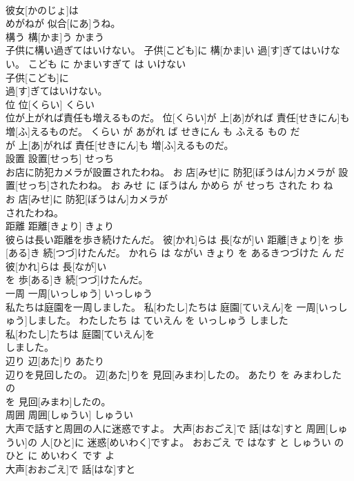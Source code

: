 \documentclass[8pt]{extreport}
\begin{document}
\begin{CJK}{UTF8}{min}
\\	彼女[かのじょ]は
\\	めがねが 似合[にあ]うね。			
\\	構う	構[かま]う	かまう	
\\	子供に構い過ぎてはいけない。	子供[こども]に 構[かま]い 過[す]ぎてはいけない。	こども に かまいすぎて は いけない	
\\	子供[こども]に
\\	過[す]ぎてはいけない。			
\\	位	位[くらい]	くらい	
\\	位が上がれば責任も増えるものだ。	位[くらい]が 上[あ]がれば 責任[せきにん]も 増[ふ]えるものだ。	くらい が あがれ ば せきにん も ふえる もの だ	
\\	が 上[あ]がれば 責任[せきにん]も 増[ふ]えるものだ。			
\\	設置	設置[せっち]	せっち	
\\	お店に防犯カメラが設置されたわね。	お 店[みせ]に 防犯[ぼうはん]カメラが 設置[せっち]されたわね。	お みせ に ぼうはん かめら が せっち された わ ね	
\\	お 店[みせ]に 防犯[ぼうはん]カメラが
\\	されたわね。			
\\	距離	距離[きょり]	きょり	
\\	彼らは長い距離を歩き続けたんだ。	彼[かれ]らは 長[なが]い 距離[きょり]を 歩[ある]き 続[つづ]けたんだ。	かれら は ながい きょり を あるきつづけた ん だ	
\\	彼[かれ]らは 長[なが]い
\\	を 歩[ある]き 続[つづ]けたんだ。			
\\	一周	一周[いっしゅう]	いっしゅう	
\\	私たちは庭園を一周しました。	私[わたし]たちは 庭園[ていえん]を 一周[いっしゅう]しました。	わたしたち は ていえん を いっしゅう しました	
\\	私[わたし]たちは 庭園[ていえん]を
\\	しました。			
\\	辺り	辺[あた]り	あたり	
\\	辺りを見回したの。	辺[あた]りを 見回[みまわ]したの。	あたり を みまわした の	
\\	を 見回[みまわ]したの。			
\\	周囲	周囲[しゅうい]	しゅうい	
\\	大声で話すと周囲の人に迷惑ですよ。	大声[おおごえ]で 話[はな]すと 周囲[しゅうい]の 人[ひと]に 迷惑[めいわく]ですよ。	おおごえ で はなす と しゅうい の ひと に めいわく です よ	
\\	大声[おおごえ]で 話[はな]すと

\end{CJK}
\end{document}
